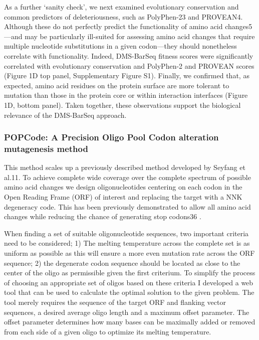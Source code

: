 As a further ‘sanity check’, we next examined evolutionary conservation and common predictors of deleteriousness, such as PolyPhen-23 and PROVEAN4.  Although these do not perfectly predict the functionality of amino acid changes5 —and may be particularly ill-suited for assessing amino acid changes that require multiple nucleotide substitutions in a given codon—they should nonetheless correlate with functionality.  Indeed, DMS-BarSeq fitness scores were significantly correlated with evolutionary conservation and PolyPhen-2 and PROVEAN scores (Figure 1D top panel, Supplementary Figure S1). Finally, we confirmed that, as expected, amino acid residues on the protein surface are more tolerant to mutation than those in the protein core or within interaction interfaces (Figure 1D, bottom panel).  Taken together, these observations support the biological relevance of the DMS-BarSeq approach.


\subsubsection{POPCode: A Precision Oligo Pool Codon alteration mutagenesis method}

This method scales up a previously described method developed by Seyfang et al.11. To achieve complete wide coverage over the complete spectrum of possible amino acid changes we design oligonucleotides centering on each codon in the Open Reading Frame (ORF) of interest and replacing the target with a NNK degeneracy code. This has been previously demonstrated to allow all amino acid changes while reducing the chance of generating stop codons36 . 

When finding a set of suitable oligonucleotide sequences, two important criteria need to be considered; 
1) The melting temperature across the complete set is as uniform as possible as this will ensure a more even mutation rate across the ORF sequence; 2) the degenerate codon sequence should be located as close to the center of the oligo as permissible given the first criterium. To simplify the process of choosing an appropriate set of oligos based on these criteria I developed a web tool that can be used to calculate the optimal solution to the given problem. The tool merely requires the sequence of the target ORF and flanking vector sequences, a desired average oligo length and a maximum offset parameter. The offset parameter determines how many bases can be maximally added or removed from each side of a given oligo to optimize its melting temperature. 

